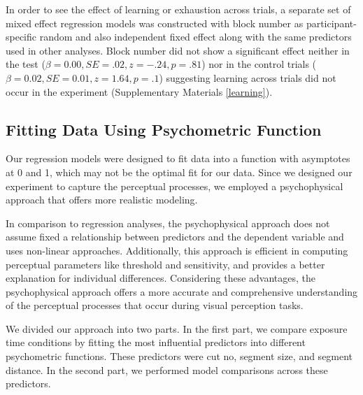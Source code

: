 \documentclass{article}
\begin{document}
In order to see the effect of learning or exhaustion across trials, a separate set of mixed effect regression models was constructed with block number as participant-specific random and also independent fixed effect along with the same predictors used in other analyses. Block number did not show a significant effect neither in the test ($\beta = 0.00, SE = .02, z = -.24, p = .81 $) nor in the control trials ($\beta = 0.02, SE = 0.01, z = 1.64, p = .1 $)  suggesting learning across trials did not occur in the experiment (Supplementary Materials \ref{learning}).


\subsection{Fitting Data Using Psychometric Function}
Our regression models were designed to fit data into a function with asymptotes at 0 and 1, which may not be the optimal fit for our data. Since we designed our experiment to capture the perceptual processes, we employed a psychophysical approach that offers more realistic modeling. 

In comparison to regression analyses, the psychophysical approach does not assume fixed a relationship between predictors and the dependent variable and uses non-linear approaches. Additionally, this approach is efficient in computing perceptual parameters like threshold and sensitivity, and provides a better explanation for individual differences. Considering these advantages, the psychophysical approach offers a more accurate and comprehensive understanding of the perceptual processes that occur during visual perception tasks.

We divided our approach into two parts. In the first part, we compare exposure time conditions by fitting the most influential predictors into different psychometric functions. These predictors were cut no, segment size, and segment distance. In the second part, we performed model comparisons across these predictors.
\end{document}

